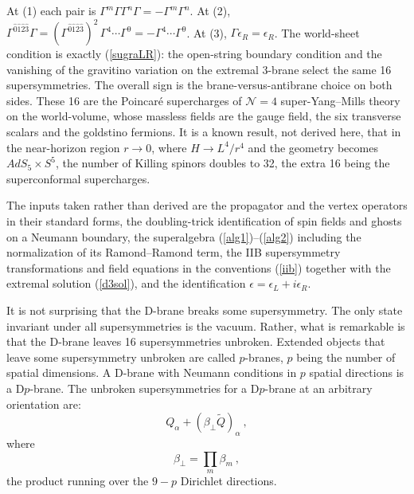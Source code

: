 \begin{tcolorbox}[breakable]
\begin{remark}
At (1) each pair is $\Gamma^m\Gamma\Gamma^n\Gamma = -\Gamma^m\Gamma^n$. At (2), $\Gamma^{\hat0\hat1\hat2\hat3}\Gamma = (\Gamma^{\hat0\hat1\hat2\hat3})^2\,\Gamma^4\cdots\Gamma^9 = -\Gamma^4\cdots\Gamma^9$. At (3), $\Gamma\epsilon_R = \epsilon_R$. The world-sheet condition is exactly (\ref{sugraLR}): the open-string boundary condition and the vanishing of the gravitino variation on the extremal 3-brane select the same 16 supersymmetries. The overall sign is the brane-versus-antibrane choice on both sides. These 16 are the Poincar\'e supercharges of $\mathcal N=4$ super-Yang--Mills theory on the world-volume, whose massless fields are the gauge field, the six transverse scalars and the goldstino fermions. It is a known result, not derived here, that in the near-horizon region $r\to0$, where $H\to L^4/r^4$ and the geometry becomes $AdS_5\times S^5$, the number of Killing spinors doubles to 32, the extra 16 being the superconformal supercharges.

The inputs taken rather than derived are the propagator and the vertex operators in their standard forms, the doubling-trick identification of spin fields and ghosts on a Neumann boundary, the superalgebra (\ref{alg1})--(\ref{alg2}) including the normalization of its Ramond--Ramond term, the IIB supersymmetry transformations and field equations in the conventions (\ref{iib}) together with the extremal solution (\ref{d3sol}), and the identification $\epsilon = \epsilon_L + i\epsilon_R$.
	\end{remark}
\end{tcolorbox}

It is not surprising that the D-brane breaks some supersymmetry. The only state invariant under all supersymmetries is the vacuum. Rather, what is remarkable is that the D-brane leaves 16 supersymmetries unbroken. Extended objects that leave some supersymmetry unbroken are called $p$-branes, $p$ being the number of spatial dimensions. A D-brane with Neumann conditions in $p$ spatial directions is a D$p$-brane. The unbroken supersymmetries for a D$p$-brane at an arbitrary orientation are:
\begin{equation}
	Q_\alpha + (\beta_\perp\tilde{Q})_\alpha \:, \label{13.2.5}
\end{equation}
where
\begin{equation}
	\beta_\perp = \prod_{m}\beta_m \:, \label{13.2.6}
\end{equation}
the product running over the $9 - p$ Dirichlet directions.

